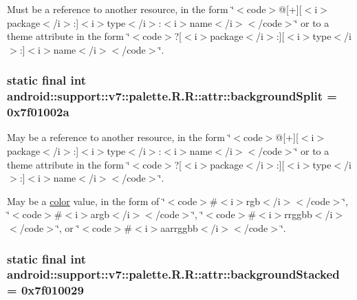 Must be a reference to another resource, in the form \char`\"{}$<$code$>$@\mbox{[}+\mbox{]}\mbox{[}$<$i$>$package$<$/i$>$:\mbox{]}$<$i$>$type$<$/i$>$:$<$i$>$name$<$/i$>$$<$/code$>$\char`\"{} or to a theme attribute in the form \char`\"{}$<$code$>$?\mbox{[}$<$i$>$package$<$/i$>$:\mbox{]}\mbox{[}$<$i$>$type$<$/i$>$:\mbox{]}$<$i$>$name$<$/i$>$$<$/code$>$\char`\"{}. \hypertarget{classandroid_1_1support_1_1v7_1_1palette_1_1_r_1_1attr_75d7b005c2fb74f8336ee15a8063fde6}{
\subsubsection[{backgroundSplit}]{\setlength{\rightskip}{0pt plus 5cm}static final int android::support::v7::palette.R.R::attr::backgroundSplit = 0x7f01002a}}
\label{classandroid_1_1support_1_1v7_1_1palette_1_1_r_1_1attr_75d7b005c2fb74f8336ee15a8063fde6}


May be a reference to another resource, in the form \char`\"{}$<$code$>$@\mbox{[}+\mbox{]}\mbox{[}$<$i$>$package$<$/i$>$:\mbox{]}$<$i$>$type$<$/i$>$:$<$i$>$name$<$/i$>$$<$/code$>$\char`\"{} or to a theme attribute in the form \char`\"{}$<$code$>$?\mbox{[}$<$i$>$package$<$/i$>$:\mbox{]}\mbox{[}$<$i$>$type$<$/i$>$:\mbox{]}$<$i$>$name$<$/i$>$$<$/code$>$\char`\"{}. 

May be a \hyperlink{classandroid_1_1support_1_1v7_1_1palette_1_1_r_1_1color}{color} value, in the form of \char`\"{}$<$code$>$\#$<$i$>$rgb$<$/i$>$$<$/code$>$\char`\"{}, \char`\"{}$<$code$>$\#$<$i$>$argb$<$/i$>$$<$/code$>$\char`\"{}, \char`\"{}$<$code$>$\#$<$i$>$rrggbb$<$/i$>$$<$/code$>$\char`\"{}, or \char`\"{}$<$code$>$\#$<$i$>$aarrggbb$<$/i$>$$<$/code$>$\char`\"{}. \hypertarget{classandroid_1_1support_1_1v7_1_1palette_1_1_r_1_1attr_bdbe6058217b81ca238078c2ae5f78c1}{
\subsubsection[{backgroundStacked}]{\setlength{\rightskip}{0pt plus 5cm}static final int android::support::v7::palette.R.R::attr::backgroundStacked = 0x7f010029}}
\label{classandroid_1_1support_1_1v7_1_1palette_1_1_r_1_1attr_bdbe6058217b81ca238078c2ae5f78c1}


